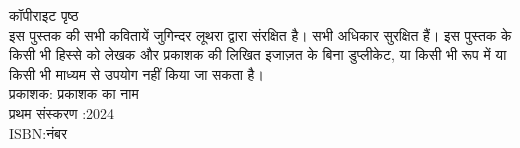 \centering
\texthindi{
कॉपीराइट पृष्ठ \\
इस पुस्तक की सभी कवितायें जुगिन्दर लूथरा  द्वारा संरक्षित है। सभी अधिकार सुरक्षित हैं। इस पुस्तक के किसी भी हिस्से को लेखक और प्रकाशक की लिखित इजाज़त के बिना डुप्लीकेट, या किसी भी रूप में या किसी भी माध्यम से उपयोग नहीं किया जा सकता है। \\
प्रकाशक: प्रकाशक का नाम \\ 
प्रथम संस्करण
}:2024\\
\centering
ISBN:\texthindi{नंबर }